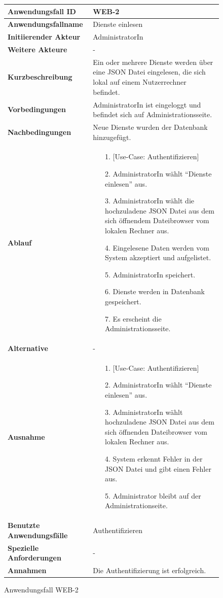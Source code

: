 \begin{figure}[h]
	\centering
	\begin{tabularx}{\textwidth}{ X | X }
		\textbf{Anwendungsfall ID} & WEB-2 \\ \hline
		\textbf{Anwendungsfallname} & Dienste einlesen \\ \hline
		\textbf{Initiierender Akteur} & AdministratorIn \\ \hline
		\textbf{Weitere Akteure} & - \\ \hline
		\textbf{Kurzbeschreibung} & Ein oder mehrere Dienste werden über eine JSON Datei eingelesen, die sich lokal auf einem Nutzerrechner befindet. \\ \hline
		\textbf{Vorbedingungen} & AdministratorIn ist eingeloggt und befindet sich auf Administrationsseite. \\ \hline
		\textbf{Nachbedingungen} & Neue Dienste wurden der Datenbank hinzugefügt. \\ \hline
		\textbf{Ablauf} &
		\begin{enumerate}
			\item [1.] [Use-Case: Authentifizieren]
			\item [2.] AdministratorIn wählt ``Dienste einlesen'' aus.
			\item [3.] AdministratorIn wählt die hochzuladene JSON Datei aus dem sich öffnendem Dateibrowser vom lokalen Rechner aus.
			\item [4.] Eingelesene Daten werden vom System akzeptiert und aufgelistet.
			\item [5.] AdministratorIn speichert.
			\item [6.] Dienste werden in Datenbank gespeichert.
			\item [7.] Es erscheint die Administrationsseite.
		\end{enumerate} \\ \hline
		\textbf{Alternative} & - \\ \hline
		\textbf{Ausnahme} &
		\begin{enumerate}
			\item [1.]  [Use-Case: Authentifizieren]
			\item [2.]  AdministratorIn wählt ``Dienste einlesen'' aus.
			\item [3.]  AdministratorIn wählt hochzuladene JSON Datei aus dem sich öffnenden Dateibrowser vom lokalen Rechner aus.
			\item [4.]  System erkennt Fehler in der JSON Datei und gibt einen Fehler aus.
			\item [5.]  Administrator bleibt auf der Administrationseite.
		\end{enumerate}  \\ \hline
		\textbf{Benutzte Anwendungsfälle} & Authentifizieren \\ \hline
		\textbf{Spezielle Anforderungen} & - \\ \hline
		\textbf{Annahmen} & Die Authentifizierung ist erfolgreich.
	\end{tabularx}
	\caption{Anwendungsfall WEB-2}
	\label{fig:anwendungsfall-server-tabelle-web-2}
\end{figure}

